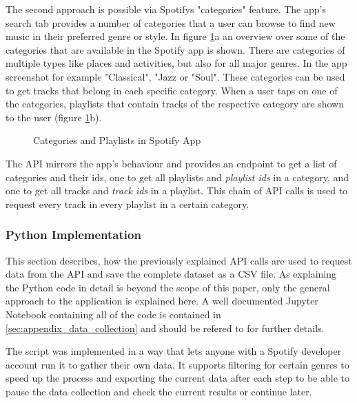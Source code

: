 The second approach is possible via Spotifys "categories" feature. The app's search tab provides a number of
categories that a user can browse to find new music in their preferred genre or style.
In figure \ref{fig:Categories and Playlists in Spotify App}a an overview over some of the categories
that are available in the Spotify app is shown. There are categories of multiple types like
places and activities, but also for all major genres. In the app screenshot
for example "Classical", "Jazz or "Soul".
These categories can be used to get tracks that belong in each specific category. When a user taps on
one of the categories, playlists that contain tracks of the respective category are shown to the user
(figure \ref{fig:Categories and Playlists in Spotify App}b).

\begin{figure}[H]
    \centering
    \qquad
    \caption{Categories and Playlists in Spotify App}%
    \label{fig:Categories and Playlists in Spotify App}%
\end{figure}

The API mirrors the app's behaviour and provides an endpoint to get a list of categories and their ids,
one to get all playlists and \emph{playlist ids} in a category, and one to get all tracks and \emph{track ids} in
a playlist. This chain of API calls is used to request every track in every playlist in a certain category.


\subsubsection{Python Implementation}

This section describes, how the previously explained API calls are used to request data from the API
and save the complete dataset as a CSV file.
As explaining the Python code in detail is beyond the scope of this paper, only the general 
approach to the application is explained here. 
A well documented Jupyter Notebook containing all of the code is contained in \ref{sec:appendix_data_collection} and should be
refered to for further details.

The script was implemented in a way that lets anyone with a Spotify
developer account run it to gather their own data.
It supports filtering for certain genres to speed up the process and exporting the current data after each step
to be able to pause the data collection and check the current results or continue later.

